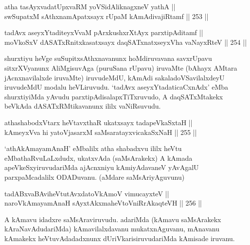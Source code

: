 
\begin{shl}
atha tasAyxvadatUpxvaRM yoVSidAliknagxneV yathA || \\
swSupatxM sAthxnamApatxsayx rUpaM kAmAdivajiRtamf \hfill || 253 ||  
\end{shl}

\begin{shl}
tadAvx aseyxYtaditeyxVvaM pArxkushxrXtAyx parxtipAditamf || \\
moVkoSxV dASATxRnitxkasatxsayx daqSATxnatxseyxVha vaNayxRteV \hfill || 254 ||   
\end{shl}

\begin{artha}
shurxtiyu heVge suSupitxsAthxnavanunx hoMdiruvavana savxrUpavu
sitxrXVyanunx AliMgisuvAga (puruSana rUpavu) iruvaMte (bAhayx AMtara
jAcnxnavilalxde iruvaMte) iruvudeMdU, kAmAdi sakaladoVSavilalxdeyU
iruvudeMdU modalu heVLiruvudu. `tadAvx aseyxYtadaticaCxnAdx' eMba shurxtiyiMda yAvudu
parxtipAdisalapxTiTxruvudo, A daqSATxMtakekx beVkAda dASATxRMtikavanunx ililx vaNiRsuvudu.
\end{artha}

\begin{shl}
athashabodxV\s tarx heVtavxthaR ukatxsayx tadapeVkaSxtaH || \\
kAmeyxVva hi yatoV\s jasarxM saMsaratayxvicakaSxNaH \hfill || 255 ||  
\end{shl}

\begin{artha}
`athAkAmayamAnaH' eMbalilx atha shabadxvu ililx heVtu eMbathaRvuLaLxdudx,
ukatxvAda (saMsArakekx) A kAmada apeVkeSxyiruvudariMda ajAcnxniyu
kAmiyAdavaneV yAvAgalU parxpaMcadalilx ODADuvanu. (aMdare saMsAriyAguvunu)
\end{artha}

\begin{shl}
tadABxvaBAviheVtutAvxdatoV\s kAmoV vimucayxteV ||  \\
naroV\s kAmayamAnaH sAyxtAkxmaheVtoVniRrAkaqteVH \hfill || 256 ||  
\end{shl}

\begin{artha}
A kAmavu idadxre saMsAraviruvudu. adariMda (kAmavu saMsArakekx
kAraNavAdudariMda) kAmavilalxdavanu mukatxnAguvanu, mAnavanu kAmakekx
heVtuvAdadadxnunx dUriVkarisiruvudariMda kAmisade iruvanu.
\end{artha}



